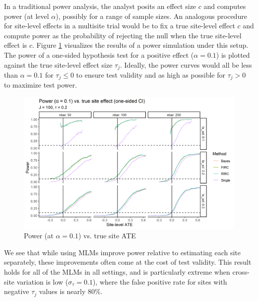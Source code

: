 \documentclass[]{article}
\begin{document}
In a traditional power analysis, the analyst posits an effect size $c$ and computes power (at level $\alpha$), possibly for a range of sample sizes.
An analogous procedure for site-level effects in a multisite trial would be to fix a true site-level effect $c$ and compute power as the probability of rejecting the null when the true site-level effect is $c$.
Figure \ref{fig:power_plot} visualizes the results of a power simulation under this setup.
The power of a one-sided hypothesis test for a positive effect ($\alpha = 0.1$) is plotted against the true site-level effect size $\tau_j$.
Ideally, the power curves would all be less than $\alpha = 0.1$ for $\tau_j \leq 0$ to ensure test validity and as high as possible for $\tau_j > 0$ to maximize test power.
\begin{figure}[ht]
	\centering
	\includegraphics[width=\textwidth]{power_plot_J100}
	\caption{Power (at $\alpha = 0.1$) vs. true site ATE}
	\label{fig:power_plot}
\end{figure}

We see that while using MLMs improve power relative to estimating each site separately, these improvements often come at the cost of test validity.
This result holds for all of the MLMs in all settings, and is particularly extreme when cross-site variation is low ($\sigma_\tau = 0.1$), where the false positive rate for sites with negative $\tau_j$ values is nearly 80\%.
\end{document}
